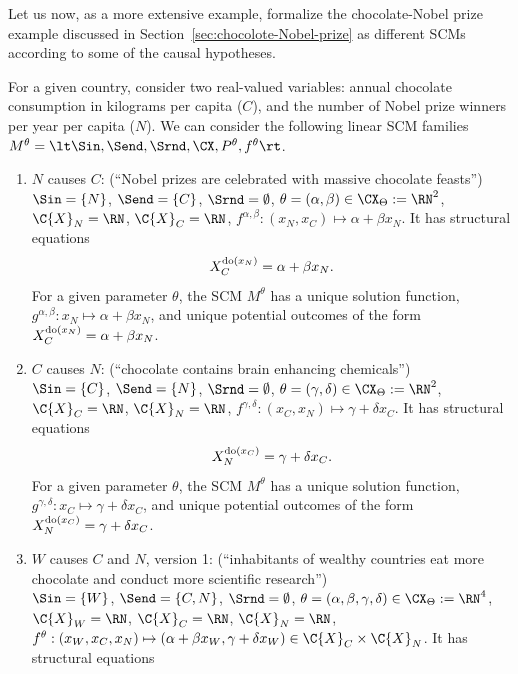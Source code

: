 Let us now, as a more extensive example, formalize the chocolate-Nobel prize example discussed in Section~\ref{sec:chocolote-Nobel-prize} as different SCMs according to some of the causal hypotheses.
\begin{Eg}\label{ex:scms_formal}
   For a given country, consider two real-valued variables: annual chocolate consumption in kilograms per capita ($C$), and the number of Nobel prize winners per year per capita ($N$).
  We can consider the following linear SCM families $M^{\theta} = \lt \Sin, \Send, \Srnd, \CX, P^\theta, f^\theta \rt$. 
  \begin{enumerate}
    \item $N$ causes $C$: (``Nobel prizes are celebrated with massive chocolate feasts'')\\
      $\Sin = \{N\}$, $\Send = \{C\}$, $\Srnd = \emptyset$, $\theta = (\alpha,\beta) \in \CX_{\Theta} := \RN^2$, 
      $\C{X}_N = \RN$, $\C{X}_C = \RN$, $f^{\alpha,\beta} : (x_N,x_C) \mapsto \alpha + \beta x_N$.
      It has structural equations
      $$X_C^{\operatorname{do}(x_N)} = \alpha + \beta x_N.$$
      For a given parameter $\theta$, the SCM $M^{\theta}$ has 
      a unique solution function, $g^{\alpha,\beta} : x_N \mapsto \alpha + \beta x_N$, and
      unique potential outcomes of the form $X_C^{\operatorname{do}(x_N)} = \alpha + \beta x_N$.
    \item $C$ causes $N$: (``chocolate contains brain enhancing chemicals'')\\
      $\Sin = \{C\}$, $\Send = \{N\}$, $\Srnd = \emptyset$, $\theta = (\gamma,\delta) \in \CX_\Theta := \RN^2$, 
      $\C{X}_C = \RN$, $\C{X}_N = \RN$, $f^{\gamma,\delta} : (x_C,x_N) \mapsto \gamma + \delta x_C$.
      It has structural equations
      $$X_N^{\operatorname{do}(x_C)} = \gamma + \delta x_C.$$
      For a given parameter $\theta$, the SCM $M^{\theta}$ has 
      a unique solution function, $g^{\gamma,\delta} : x_C \mapsto \gamma + \delta x_C$, and
      unique potential outcomes of the form $X_N^{\operatorname{do}(x_C)} = \gamma + \delta x_C$.
    \item $W$ causes $C$ and $N$, version 1: (``inhabitants of wealthy countries eat more chocolate and conduct more scientific research'')\\
      $\Sin = \{W\}$, $\Send = \{C,N\}$, $\Srnd = \emptyset$, $\theta = (\alpha,\beta,\gamma,\delta) \in \CX_\Theta := \RN^4$, 
      $\C{X}_W = \RN$, $\C{X}_C = \RN$, $\C{X}_N = \RN$, $f^{\theta} : (x_W,x_C,x_N) \mapsto (\alpha + \beta x_W, \gamma + \delta x_W) \in \C{X}_C \times \C{X}_N$.
      It has structural equations
      \begin{align*}

\end{align*}
\end{enumerate}
\end{Eg}
